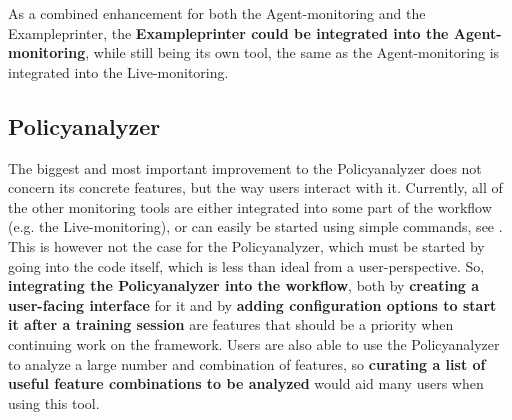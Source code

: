 As a combined enhancement for both the Agent-monitoring and the Exampleprinter, the \textbf{Exampleprinter could be integrated into the Agent-monitoring}, while still being its own tool, the same as the Agent-monitoring is integrated into the Live-monitoring.

\subsection*{Policyanalyzer}\label{subsec:FuturePolicyAnalyzer}

The biggest and most important improvement to the Policyanalyzer does not concern its concrete features, but the way users interact with it. Currently, all of the other monitoring tools are either integrated into some part of the workflow (e.g. the Live-monitoring), or can easily be started using simple commands, see . This is however not the case for the Policyanalyzer, which must be started by going into the code itself, which is less than ideal from a user-perspective. So, \textbf{integrating the Policyanalyzer into the workflow}, both by \textbf{creating a user-facing interface} for it and by \textbf{adding configuration options to start it after a training session} are features that should be a priority when continuing work on the framework. Users are also able to use the Policyanalyzer to analyze a large number and combination of features, so \textbf{curating a list of useful feature combinations to be analyzed} would aid many users when using this tool.